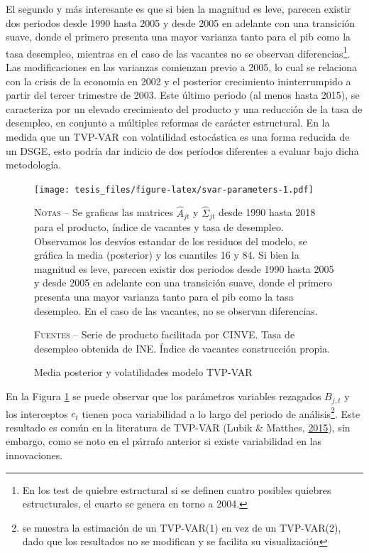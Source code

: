 \documentclass[12pt,oneside]{reedthesis}
\begin{document}
El segundo y más interesante es que si bien la magnitud es leve, parecen existir dos periodos desde 1990 hasta 2005 y desde 2005 en adelante con una transición suave, donde el primero presenta una mayor varianza tanto para el pib como la tasa desempleo, mientras en el caso de las vacantes no se observan diferencias\footnote{En los test de quiebre estructural si se definen cuatro posibles quiebres estructurales, el cuarto se genera en torno a 2004.}. Las modificaciones en las varianzas comienzan previo a 2005, lo cual se relaciona con la crisis de la economía en 2002 y el posterior crecimiento ininterrumpido a partir del tercer trimestre de 2003. Este último periodo (al menos hasta 2015), se caracteriza por un elevado crecimiento del producto y una reducción de la tasa de desempleo, en conjunto a múltiples reformas de carácter estructural. En la medida que un TVP-VAR con volatilidad estocástica es una forma reducida de un DSGE, esto podría dar indicio de dos períodos diferentes a evaluar bajo dicha metodología.
\begin{landscape}
\begin{figure}
\texttt{[image: tesis\_files/figure-latex/svar-parameters-1.pdf]}
\caption{Media posterior y volatilidades modelo TVP-VAR}\label{fig:svar-parameters}\textsc{}

\footnotesize\textsc{Notas} -- Se graficas las matrices $\hat{A}_{jt}$ y $\hat{\Sigma}_{jt}$ desde 1990 hasta 2018 para el producto, índice de vacantes y tasa de desempleo. Observamos los desvíos estandar de los residuos del modelo, se gráfica la media (posterior) y los cuantiles 16 y 84. Si bien la magnitud es leve, parecen existir dos periodos desde 1990 hasta 2005 y desde 2005 en adelante con una transición suave, donde el primero presenta una mayor varianza tanto para el pib como la tasa desempleo. En el caso de las vacantes, no se observan diferencias.

\textsc{Fuentes} -- Serie de producto facilitada por CINVE. Tasa de desempleo obtenida de INE. Índice de vacantes construcción propia.
\end{figure}
\end{landscape}
En la Figura \ref{fig:svar-parameters} se puede observar que los parámetros variables rezagados \(B_{j,t}\) y los interceptos \(c_{t}\) tienen poca variabilidad a lo largo del periodo de análisis\footnote{se muestra la estimación de un TVP-VAR(1) en vez de un TVP-VAR(2), dado que los resultados no se modifican y se facilita su visualización}. Este resultado es común en la literatura de TVP-VAR (Lubik \& Matthes, \protect\hyperlink{ref-Lubik2016b}{2015}), sin embargo, como se noto en el párrafo anterior si existe variabilidad en las innovaciones.
\end{document}

